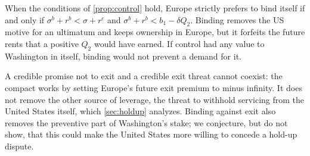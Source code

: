 \begin{remark}\label{rem:bind}
When the conditions of \cref{prop:control} hold, Europe strictly prefers to bind itself if and only if $\sigma^b + r^b < \sigma + r^c$ and $\sigma^b + r^b < b_1 - \delta Q_2$. Binding removes the US motive for an ultimatum and keeps ownership in Europe, but it forfeits the future rents that a positive $Q_2$ would have earned. If control had any value to Washington in itself, binding would not prevent a demand for it.
\end{remark}

A credible promise not to exit and a credible exit threat cannot coexist: the compact works by setting Europe's future exit premium to minus infinity. It does not remove the other source of leverage, the threat to withhold servicing from the United States itself, which \cref{sec:holdup} analyzes. Binding against exit also removes the preventive part of Washington's stake; we conjecture, but do not show, that this could make the United States more willing to concede a hold-up dispute.
